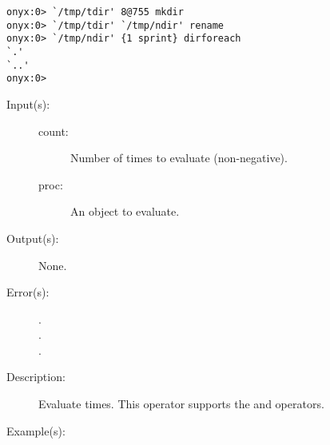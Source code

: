 \begin{description}
\begin{description}
\begin{verbatim}
onyx:0> `/tmp/tdir' 8@755 mkdir
onyx:0> `/tmp/tdir' `/tmp/ndir' rename
onyx:0> `/tmp/ndir' {1 sprint} dirforeach
`.'
`..'
onyx:0>
		\end{verbatim}
	\end{description}
\label{systemdict:repeat}
\item[{\onyxop{count proc}{repeat}{--}}: ]
	\begin{description}\item[]
	\item[Input(s): ]
		\begin{description}\item[]
		\item[count: ]
			Number of times to evaluate  (non-negative).
		\item[proc: ]
			An object to evaluate.
		\end{description}
	\item[Output(s): ] None.
	\item[Error(s): ]
		\begin{description}\item[]
		\item[.]
		\item[.]
		\item[.]
		\end{description}
	\item[Description: ]
		Evaluate   times.  This operator
		supports the
		 and
		 operators.
	\item[Example(s): ]\begin{verbatim}


\end{verbatim}
\end{description}
\end{description}
